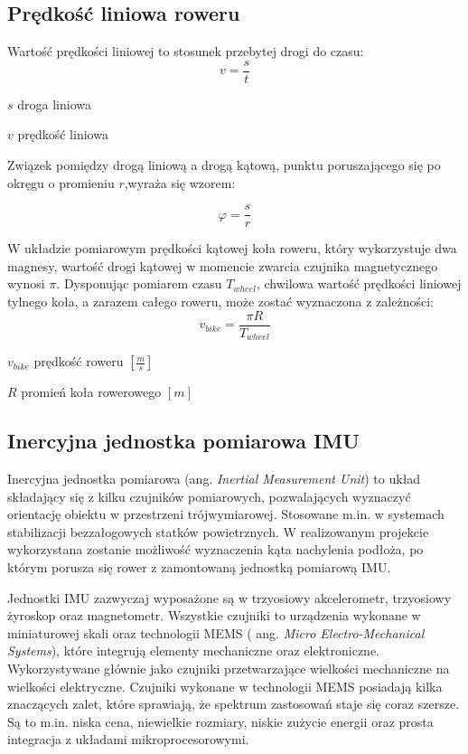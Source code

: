 \subsection{Prędkość liniowa roweru}
Wartość prędkości liniowej to stosunek przebytej drogi do czasu:
\begin{equation}
    v = \frac{s}{t}
\end{equation}
\begin{eqwhere}[2cm]
	\item[$s$] droga liniowa
	\item[$v$] prędkość liniowa
\end{eqwhere}
 Związek pomiędzy drogą liniową a drogą kątową, punktu poruszającego się po okręgu o promieniu $r$,wyraża się wzorem:

\begin{equation}
    \varphi = \frac{s}{r}
\end{equation}

W układzie pomiarowym prędkości kątowej koła roweru, który wykorzystuje dwa magnesy, wartość drogi kątowej w momencie zwarcia czujnika magnetycznego wynosi $\pi$. Dysponując pomiarem czasu $T_{wheel}$, chwilowa wartość prędkości liniowej tylnego koła, a zarazem całego roweru, może zostać wyznaczona z zależności:
 \begin{equation}
    \label{eq:zaleznoscNaPredkosc}
    v_{bike} = \frac{\pi R}{T_{wheel}}
\end{equation}
\begin{eqwhere}[2cm]
    \item[$v_{bike}$] prędkość roweru $[\frac{m}{s}]$
	\item[$R$] promień koła rowerowego $[m]$
\end{eqwhere}
\subsection{Inercyjna jednostka pomiarowa IMU}
Inercyjna jednostka pomiarowa (ang. {\em Inertial Measurement Unit}) to układ składający się z kilku czujników pomiarowych, pozwalających wyznaczyć orientację obiektu w przestrzeni trójwymiarowej. Stosowane m.in. w systemach stabilizacji bezzałogowych statków powietrznych. W realizowanym projekcie wykorzystana zostanie możliwość wyznaczenia kąta nachylenia podłoża, po którym porusza się rower z zamontowaną jednostką pomiarową IMU.

Jednostki IMU zazwyczaj wyposażone są w trzyosiowy akcelerometr, trzyosiowy żyroskop oraz magnetometr. Wszystkie czujniki to urządzenia wykonane w miniaturowej skali oraz technologii MEMS ( ang. {\em Micro Electro-Mechanical Systems}), które integrują elementy mechaniczne oraz elektroniczne. Wykorzystywane głównie jako czujniki przetwarzające wielkości mechaniczne na wielkości elektryczne. Czujniki wykonane w technologii MEMS posiadają kilka znaczących zalet, które sprawiają, że spektrum zastosowań staje się coraz szersze. Są to m.in. niska cena, niewielkie rozmiary, niskie zużycie energii oraz prosta integracja z układami mikroprocesorowymi. 

